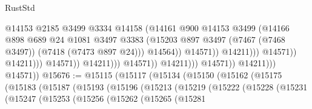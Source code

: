 \begin{lexlean}{RustStd}
\begin{coremodule}
                                                          @14153
                                                          @2185
                                                          @3499
                                                          @3334
                                                          @14158
                                                          (@14161
                                                            @900
                                                            @14153
                                                            @3499
                                                            (@14166
                                                              @898
                                                              @689
                                                              @24
                                                              @1081
                                                              @3497
                                                              @3383
                                                              (@15203
                                                                @897
                                                                @3497
                                                                (@7467 (@7468 @3497))
                                                                (@7418 (@7473 @897 @24)))
                                                              @14564))
                                                          @14571))
                                                      @14211)))
                                                @14571))
                                            @14211)))
                                      @14571))
                                  @14211)))
                            @14571))
                        @14211)))
                  @14571))
              @14211)))
        @14571))
@15676 := @15115
    (@15117
      (@15134
        (@15150
          (@15162
            (@15175
              (@15183
                (@15187
                  (@15193
                    (@15196
                      (@15213
                        (@15219
                          (@15222
                            (@15228
                              (@15231
                                (@15247
                                  (@15253
                                    (@15256
                                      (@15262
                                        (@15265
                                          (@15281

\end{coremodule}
\end{lexlean}
